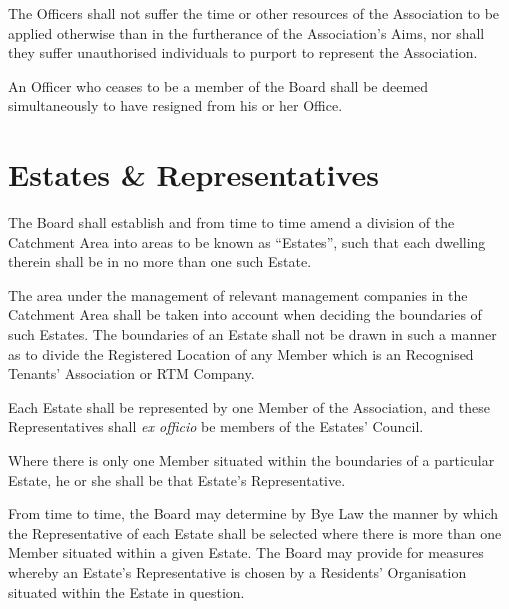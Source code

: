 \documentclass[12pt]{article}
\newcommand{\EC}[0]{Board}
\newcommand{\Exec}[0]{\EC{} }
\newcommand{\RA}[0]{Residents' Organisation}
\newcommand{\RTA}[0]{Recognised Tenants' Association}
\begin{document}
\begin{constenum}
    \item The Officers shall not suffer the time or other resources of
      the Association to be applied otherwise than in the furtherance of
      the Association's Aims, nor shall they suffer unauthorised individuals
      to purport to represent the Association.

    \item An Officer who ceases to be a member of the \Exec shall be
      deemed simultaneously to have resigned from his or her Office.

  \end{constenum}


\section{Estates \& Representatives}

\begin{constenum}

\item The \Exec shall establish and from time to time amend a division
  of the Catchment Area into areas to be known as ``Estates'', such
  that each dwelling therein shall be in no more than one such Estate.

\item The area under the management of relevant management
  companies in the Catchment Area shall be taken into account when
  deciding the boundaries of such Estates. The boundaries of an Estate
  shall not be drawn in such a manner as to divide the Registered
  Location of any Member which is an \RTA{} or RTM Company.

\item
  Each Estate shall be represented
  by one Member of the Association, and these
  Representatives shall \textit{ex officio} be members of the
  Estates' Council.

\item
  Where there is only one Member situated within
  the boundaries of a particular Estate, he or she shall be that
  Estate's Representative.

\item
  From time to time, the \Exec may determine by Bye Law the manner by
  which the Representative of each Estate shall be selected where
  there is more than one Member situated within a
  given Estate.  The \Exec may provide for measures whereby an
  Estate's Representative is chosen by a \RA{} situated within the Estate in
  question.

\end{constenum}
\end{document}
